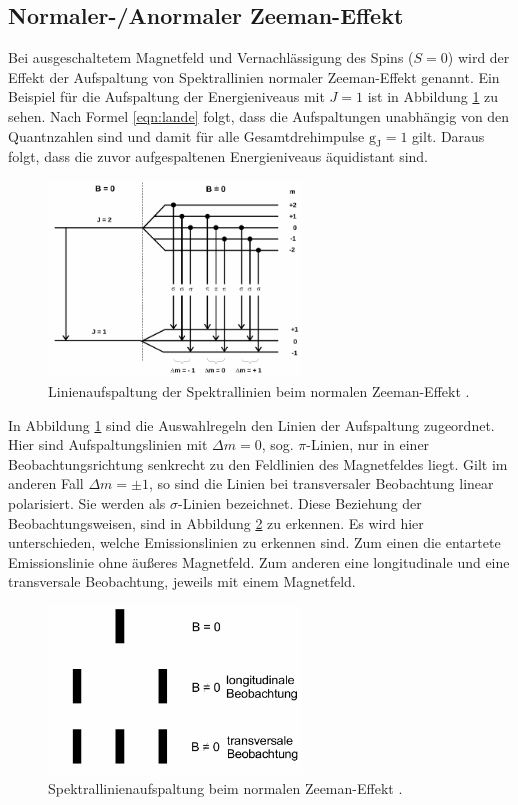 \subsection{Normaler-/Anormaler Zeeman-Effekt}
\label{sec:Zeeman}
Bei ausgeschaltetem Magnetfeld und Vernachlässigung des Spins ($S = \num{0}$) wird
der Effekt der Aufspaltung von Spektrallinien normaler Zeeman-Effekt genannt.
Ein Beispiel für die Aufspaltung der Energieniveaus mit $J = 1$ ist in Abbildung
\ref{abb:normal} zu sehen. Nach Formel \ref{eqn:lande} folgt, dass die Aufspaltungen
unabhängig von den Quantnzahlen sind und damit für alle Gesamtdrehimpulse $\text{g}_\text{J} = 1$
gilt. Daraus folgt, dass die zuvor aufgespaltenen Energieniveaus äquidistant sind.
\begin{figure}[htb]
  \centering
  \includegraphics[width=0.6\textwidth]{images/V27_3.pdf}
  \caption{Linienaufspaltung der Spektrallinien beim normalen Zeeman-Effekt
  \cite{anleitung}.}
  \label{abb:normal}
\end{figure}
In Abbildung \ref{abb:normal} sind die Auswahlregeln den Linien der Aufspaltung
zugeordnet.
Hier sind Aufspaltungslinien mit $\Delta m = \num{0}$, sog. $\pi$-Linien, nur in
einer Beobachtungsrichtung senkrecht zu den Feldlinien des Magnetfeldes liegt.
Gilt im anderen Fall $\Delta m = \pm 1$, so sind die Linien bei transversaler
Beobachtung linear polarisiert. Sie werden als $\sigma$-Linien bezeichnet.
Diese Beziehung der Beobachtungsweisen, sind
in Abbildung \ref{abb:spektral} zu erkennen. Es wird hier unterschieden, welche
Emissionslinien zu erkennen sind. Zum einen die entartete Emissionslinie ohne
äußeres Magnetfeld. Zum anderen eine longitudinale und eine transversale Beobachtung,
jeweils mit einem Magnetfeld.
\begin{figure}[htb]
  \centering
  \includegraphics[width=0.6\textwidth]{images/V27_4.pdf}
  \caption{Spektrallinienaufspaltung beim normalen Zeeman-Effekt \cite{anleitung}.}
  \label{abb:spektral}
\end{figure}

